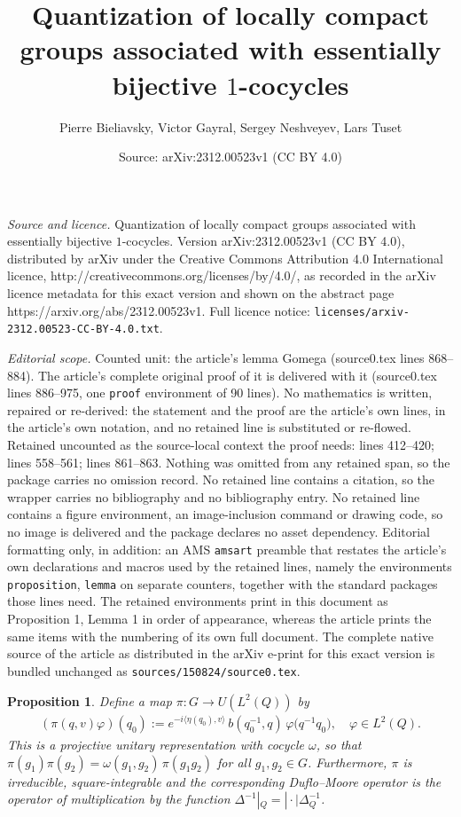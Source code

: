 \documentclass[10pt,a4paper]{amsart}
\title{Quantization of locally compact groups associated with essentially bijective \texorpdfstring{$1$}{1}-cocycles}
\author{Pierre Bieliavsky, Victor Gayral, Sergey Neshveyev, Lars Tuset}
\date{Source: arXiv:2312.00523v1 (CC BY 4.0)}
\newtheorem{proposition}{Proposition}
\newcommand{\vf}{\varphi}
\begin{document}
\maketitle

\noindent\emph{Source and licence.} Quantization of locally compact groups associated with essentially bijective \texorpdfstring{$1$}{1}-cocycles. Version arXiv:2312.00523v1 (CC BY 4.0), distributed by arXiv under the Creative Commons Attribution 4.0 International licence, http://creativecommons.org/licenses/by/4.0/, as recorded in the arXiv licence metadata for this exact version and shown on the abstract page https://arxiv.org/abs/2312.00523v1. Full licence notice: \texttt{licenses/arxiv-2312.00523-CC-BY-4.0.txt}.\par\smallskip

\noindent\textit{Editorial scope.} Counted unit: the article's lemma Gomega (source0.tex lines 868--884). The article's complete original proof of it is delivered with it (source0.tex lines 886--975, one \texttt{proof} environment of 90 lines). No mathematics is written, repaired or re-derived: the statement and the proof are the article's own lines, in the article's own notation, and no retained line is substituted or re-flowed.  Retained uncounted as the source-local context the proof needs: lines 412--420; lines 558--561; lines 861--863.  Nothing was omitted from any retained span, so the package carries no omission record.  No retained line contains a citation, so the wrapper carries no bibliography and no bibliography entry.  No retained line contains a figure environment, an image-inclusion command or drawing code, so no image is delivered and the package declares no asset dependency.  Editorial formatting only, in addition: an AMS \texttt{amsart} preamble that restates the article's own declarations and macros used by the retained lines, namely the environments \texttt{proposition}, \texttt{lemma} on separate counters, together with the standard packages those lines need.  The retained environments print in this document as Proposition 1, Lemma 1 in order of appearance, whereas the article prints the same items with the numbering of its own full document.  The complete native source of the article as distributed in the arXiv e-print for this exact version is bundled unchanged as \texttt{sources/150824/source0.tex}.
\begin{proposition}\label{prop:representation}
Define a map $\pi\colon G\to U(L^2(Q))$ by
\begin{align}
\label{def-pi}
(\pi(q,v)\vf)(q_0):=e^{-i \langle\eta(q_0),v\rangle}\,b (q_0^{-1},q)\,\vf\big(q^{-1}q_0\big),\quad \vf\in L^2(Q).
\end{align}
This is a projective unitary representation with cocycle $\omega$, so that $\pi(g_1)\pi(g_2)=\omega(g_1,g_2)\,\pi(g_1g_2)$ for all $g_1,g_2\in G$.
Furthermore, $\pi$ is irreducible, square-integrable and the corresponding Duflo--Moore operator is the operator of multiplication by the function $\Delta^{-1}|_Q=|\cdot|\Delta_Q^{-1}$.
\end{proposition}
\end{document}
